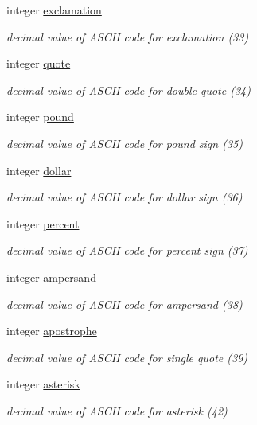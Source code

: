 \begin{DoxyCompactItemize}
integer \hyperlink{classascii_af5fe9f0207e37c108e594174a79f65c1}{exclamation}
\begin{DoxyCompactList}\small\item\em decimal value of A\-S\-C\-I\-I code for exclamation (33) \end{DoxyCompactList}\item 
integer \hyperlink{classascii_a85a2d9bbeb7696015eb149345012ac0d}{quote}
\begin{DoxyCompactList}\small\item\em decimal value of A\-S\-C\-I\-I code for double quote (34) \end{DoxyCompactList}\item 
integer \hyperlink{classascii_ad5f296b38407b7996fdb4bccc12c416e}{pound}
\begin{DoxyCompactList}\small\item\em decimal value of A\-S\-C\-I\-I code for pound sign (35) \end{DoxyCompactList}\item 
integer \hyperlink{classascii_a4ddf8a7aeafe0b370f21dbd7e264101f}{dollar}
\begin{DoxyCompactList}\small\item\em decimal value of A\-S\-C\-I\-I code for dollar sign (36) \end{DoxyCompactList}\item 
integer \hyperlink{classascii_a9e2bfb6070304c20dd4ea1efc8ebdf2c}{percent}
\begin{DoxyCompactList}\small\item\em decimal value of A\-S\-C\-I\-I code for percent sign (37) \end{DoxyCompactList}\item 
integer \hyperlink{classascii_adc2c00ee0f6aa85ba337326a85360b81}{ampersand}
\begin{DoxyCompactList}\small\item\em decimal value of A\-S\-C\-I\-I code for ampersand (38) \end{DoxyCompactList}\item 
integer \hyperlink{classascii_a544369830d6a173e0e041bc662570e5d}{apostrophe}
\begin{DoxyCompactList}\small\item\em decimal value of A\-S\-C\-I\-I code for single quote (39) \end{DoxyCompactList}\item 
integer \hyperlink{classascii_acc920ceac14d38de4689188ad4db458d}{asterisk}
\begin{DoxyCompactList}\small\item\em decimal value of A\-S\-C\-I\-I code for asterisk (42) \end{DoxyCompactList}\item 

\end{DoxyCompactItemize}
